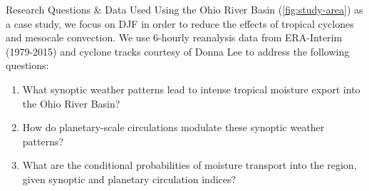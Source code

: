 \begin{block}{Research Questions \& Data Used}
    Using  the Ohio River Basin (\cref{fig:study-area}) as a case study, we focus on DJF in order to reduce the effects of tropical cyclones and mesocale convection.
     We use 6-hourly reanalysis data from ERA-Interim \cite{Dee2011} (1979-2015) and cyclone tracks courtesy of Donna Lee \cite{Booth2015} to address the following questions:
    \begin{enumerate}
        \item What synoptic weather patterns lead to intense tropical moisture export into the Ohio River Basin?
        \item How do planetary-scale circulations modulate these synoptic weather patterns?
        \item What are the conditional probabilities of moisture transport into the region, given synoptic and planetary circulation indices?
    \end{enumerate}
\end{block}
